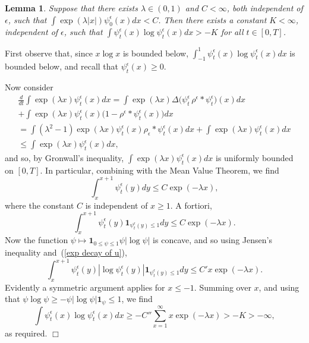 \documentclass[12pt]{article}
\newenvironment {proof}{{\noindent\bf Proof }}{\hfill $\Box$ \medskip}
\newtheorem{lemma}[theorem]{Lemma}
\newcommand{\ind}{\mathbf{1}}
\newcommand{\kernel}{\rho}  %
\newcommand{\smooth}[1]{\kernel_{#1} \! * \!}  %
\numberwithin{equation}{section}
\begin{document}
\begin{lemma}
\label{lower bound on ulogu}
	Suppose that there exists $\lambda\in (0,1)$ and $C<\infty$, both independent of
$\epsilon$, such that $\int \exp(\lambda |x|) \psi_0^\epsilon(x) dx<C$.
Then there exists
a constant $K<\infty$, independent of $\epsilon$, such that  
 $\int \psi_t^\epsilon(x)\log \psi_t^\epsilon (x)dx>-K$ for all $t\in [0,T]$. 
\end{lemma}
\begin{proof}
First observe that, since $x\log x$ is bounded below, 
$\int_{-1}^1\psi_t^\epsilon(x)\log\psi_t^\epsilon(x) dx$ is bounded below,
and recall that $\psi_t^\epsilon(x) \ge 0$.

Now consider 
\begin{multline}
\frac{d}{dt}\int \exp(\lambda x) \psi_t^\epsilon (x)dx
	= \int \exp(\lambda x)\Delta \big(\psi_t^\epsilon \, \rho^{\epsilon}*\psi_t^\epsilon\big)(x) dx
	\\
	+ \int \exp(\lambda x)\psi_t^\epsilon(x)\big(1-\rho^{\epsilon}*\psi_t^\epsilon(x)\big) dx
    \\
	= \int (\lambda^2-1)\exp(\lambda x) \psi_t^\epsilon(x) \smooth{\epsilon} \psi_t^\epsilon(x) dx 
	+ \int \exp(\lambda x)\psi_t^\epsilon(x) dx
    \\
    \leq \int \exp(\lambda x)\psi_t^\epsilon(x) dx,
\end{multline}
and so, by Gronwall's inequality, 
$\int \exp(\lambda x)\psi_t^\epsilon (x)dx$ is uniformly bounded on $[0,T]$.
In particular, combining with the Mean Value Theorem, we find 
\begin{equation*}
\int_x^{x+1}\psi_t^\epsilon(y)dy\leq C\exp(-\lambda x),
\end{equation*}
where the constant $C$ is independent of $x\geq1$.
A fortiori, 
\begin{equation}
\label{exp decay of u} 
\int_x^{x+1}\psi_t^\epsilon(y)\ind_{\psi_t^\epsilon(y)\leq 1}dy\leq C\exp(-\lambda x).
\end{equation}
Now the function $\psi\mapsto \ind_{0\leq \psi\leq 1}\psi|\log \psi|$ is concave, and so 
using Jensen's inequality and~(\ref{exp decay of u}),
\begin{equation*}
\int_x^{x+1}\psi_t^\epsilon(y)
|\log \psi_t^\epsilon (y)|\ind_{\psi_t^\epsilon(y)\leq 1}dy
\leq C'x \exp(-\lambda x).
\end{equation*}
Evidently a symmetric argument applies for $x\leq -1$.
Summing over $x$,
and using that $\psi \log \psi \ge - \psi |\log \psi| \ind_\psi \le 1$,
we find
\begin{equation*}
\int \psi_t^\epsilon (x) \log \psi_t^\epsilon (x) dx
\geq -C''\sum_{x=1}^\infty x\exp(-\lambda x)>-K>-\infty,  
\end{equation*}
as required.
\end{proof}
\end{document}
